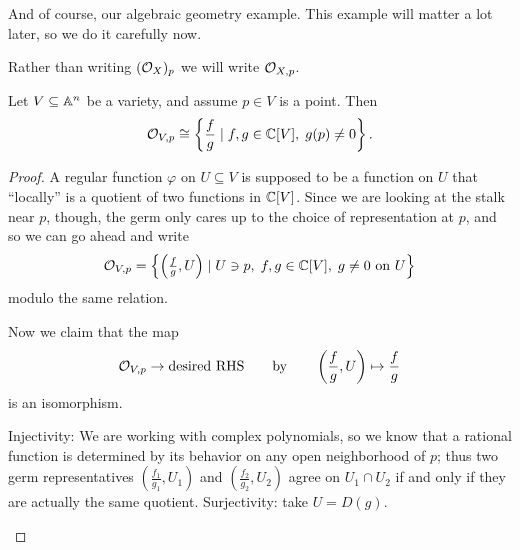 And of course, our algebraic geometry example.
This example will matter a lot later,
so we do it carefully now.
\begin{abuse}
	Rather than writing $(\mathcal O_X)_p$ we will write $\mathcal O_{X,p}$.
\end{abuse}
\begin{theorem}
	[Stalks of $\OO_V$]
	\label{thm:stalks_affine_var}
	Let $V \subseteq \mathbb A^n$ be a variety,
	and assume $p \in V$ is a point.
	Then \[ \mathcal O_{V,p} \cong
		\left\{ \frac fg \mid f,g \in \mathbb C[V], \; g(p) \ne 0 \right\}. \]
\end{theorem}
\begin{proof}
	A regular function $\varphi$ on $U \subseteq V$
	is supposed to be a function on $U$ that ``locally'' is a quotient
	of two functions in $\mathbb C[V]$.
	Since we are looking at the stalk near $p$, though,
	the germ only cares up to the choice of representation at $p$,
	and so we can go ahead and write
	\[
		\mathcal O_{V,p} = 
		\left\{ \left( \tfrac fg , U \right) \mid 
			U \ni p, \; f,g \in \mathbb C[V], \;
			\text{$g \neq 0$ on $U$} \right\}
	\]
	modulo the same relation.

	Now we claim that the map
	\[ \mathcal O_{V,p} \to \text{desired RHS}
		\qquad\text{by}\qquad \left( \frac fg, U \right) \mapsto \frac fg \]
	is an isomorphism.
	\begin{itemize}
		\ii Injectivity: We are working with complex polynomials,
		so we know that a rational function is determined by its
		behavior on any open neighborhood of $p$;
		thus two germ representatives $(\frac{f_1}{g_1}, U_1)$
		and $(\frac{f_2}{g_2}, U_2)$ agree on $U_1 \cap U_2$
		if and only if they are actually the same quotient.
		\ii Surjectivity: take $U = D(g)$. \qedhere
	\end{itemize}
\end{proof}

